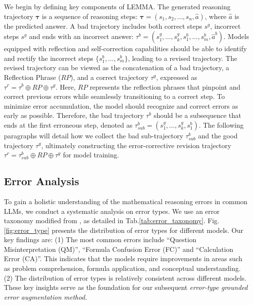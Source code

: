 \documentclass[11pt]{article}
\begin{document}
We begin by defining key components of LEMMA. The generated reasoning trajectory $\mathbf{\tau}$ is a sequence of reasoning steps: $\mathbf{\tau} = (s_{1}, s_{2}, \dots, s_{n}, \hat{a})$, where $\hat{a}$ is the predicted answer. 
A bad trajectory includes both correct steps $s^{g}$, incorrect steps $s^{g}$ and ends with an incorrect answer: $\tau^{b} = (s^{g}_{1}, \dots, s^{g}_{k}, s^{b}_{1}, \dots, s^{b}_{m}, \hat{a}^{b})$.
Models equipped with reflection and self-correction capabilities should be able to identify and rectify the incorrect steps $\{s^{b}_{1}, ..., s^{b}_{m}\}$, leading to a revised trajectory. The revised trajectory can be viewed as the concatenation of a bad trajectory, a Reflection Phrase ($\textit{RP}$), and a correct trajectory $\tau^{g}$, expressed as $\tau^{r}=\tau^{b} \oplus \textit{RP} \oplus \tau^{g}$. Here, $\textit{RP}$ represents the reflection phrases that pinpoint and correct previous errors while seamlessly transitioning to a correct step. To minimize error accumulation, the model should recognize and correct errors as early as possible. Therefore, the bad trajectory $\tau^{b}$ should be a subsequence that ends at the first erroneous step, denoted as $\tau^{b}_{sub} = (s^{g}_{1}, \dots, s^{g}_{k}, s^{b}_{1})$. The following paragraphs will detail how we collect the bad sub-trajectory $\tau^{b}_{sub}$ and the good trajectory $\tau^{g}$, ultimately constructing the error-corrective revision trajectory $\tau^{r} = \tau^{b}_{sub} \oplus \textit{RP} \oplus \tau^{g}$ for model training.

\subsection{Error Analysis}
\label{sec:error_analysis}

To gain a holistic understanding of the mathematical reasoning errors in common LLMs, we conduct a systematic analysis on error types. We use an error taxonomy modified from \citet{li-etal-2024-evaluating-mathematical}, as detailed in Tab.\ref{tab:error_taxonomy}. Fig.\ref{fig:error_type} presents the distribution of error types for different models. Our key findings are: (1) The most common errors include ``Question Misinterpretation (QM)'', ``Formula Confusion Error (FC)'' and ``Calculation Error (CA)''. This indicates that the models require improvements in areas such as problem comprehension, formula application, and conceptual understanding. (2) The distribution of error types is relatively consistent across different models. These key insights serve as the foundation for our subsequent \textit{error-type grounded error augmentation method.}
\end{document}
